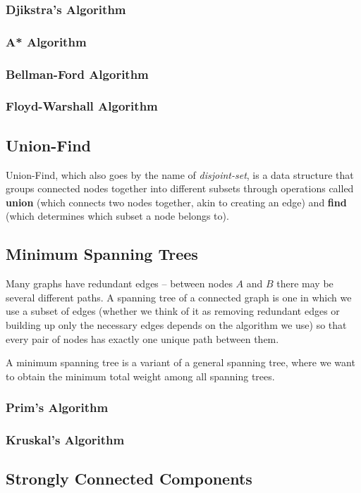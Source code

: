 \subsubsection{Djikstra's Algorithm}
\subsubsection{A* Algorithm}
\subsubsection{Bellman-Ford Algorithm}
\subsubsection{Floyd-Warshall Algorithm}
\subsection{Union-Find}

Union-Find, which also goes by the name of \textit{disjoint-set}, is a data structure that groups connected nodes together into different subsets through operations called \textbf{union} (which connects two nodes together, akin to creating an edge) and \textbf{find} (which determines which subset a node belongs to).

\subsection{Minimum Spanning Trees}

Many graphs have redundant edges -- between nodes $A$ and $B$ there may be several different paths. A spanning tree of a connected graph is one in which we use a subset of edges (whether we think of it as removing redundant edges or building up only the necessary edges depends on the algorithm we use) so that every pair of nodes has exactly one unique path between them.

A minimum spanning tree is a variant of a general spanning tree, where we want to obtain the minimum total weight among all spanning trees.

\subsubsection{Prim's Algorithm}
\subsubsection{Kruskal's Algorithm}
\subsection{Strongly Connected Components}

